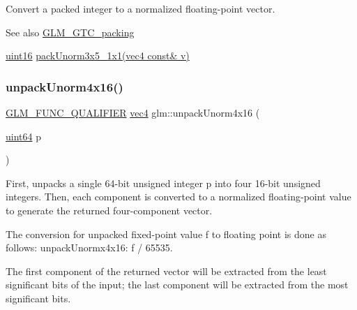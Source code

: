 Convert a packed integer to a normalized floating-\/point vector.

\begin{DoxySeeAlso}{See also}
\hyperlink{group__gtc__packing}{G\+L\+M\+\_\+\+G\+T\+C\+\_\+packing} 

\hyperlink{group__gtc__type__precision_gad8c2939e1fdd8e5828b31d95c52255d5}{uint16} \hyperlink{group__gtc__packing_ga1b41375846ed66768da78ca299d8d010}{pack\+Unorm3x5\+\_\+1x1(vec4 const\& v)} 
\end{DoxySeeAlso}
\mbox{\label{group__gtc__packing_gafb2b502bc406031a5618ce930139a9e3}} 
\subsubsection{\texorpdfstring{unpack\+Unorm4x16()}{unpackUnorm4x16()}}
{\footnotesize\ttfamily \hyperlink{setup_8hpp_a33fdea6f91c5f834105f7415e2a64407}{G\+L\+M\+\_\+\+F\+U\+N\+C\+\_\+\+Q\+U\+A\+L\+I\+F\+I\+ER} \hyperlink{group__core__types_ga5881b1b022d7fd1b7218f5916532dd02}{vec4} glm\+::unpack\+Unorm4x16 (\begin{DoxyParamCaption}\item[{\hyperlink{group__gtc__type__precision_gae3632bf9b37da66233d78930dd06378a}{uint64}}]{p }\end{DoxyParamCaption})}

First, unpacks a single 64-\/bit unsigned integer p into four 16-\/bit unsigned integers. Then, each component is converted to a normalized floating-\/point value to generate the returned four-\/component vector.

The conversion for unpacked fixed-\/point value f to floating point is done as follows\+: unpack\+Unormx4x16\+: f / 65535.

The first component of the returned vector will be extracted from the least significant bits of the input; the last component will be extracted from the most significant bits.

